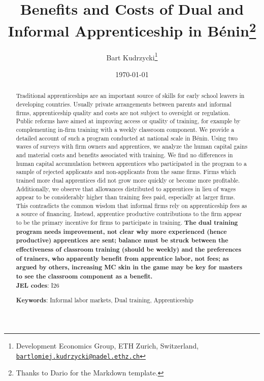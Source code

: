 \documentclass[
  11pt,
a4paper
]{article}
\title{Benefits and Costs of Dual and Informal Apprenticeship in Bénin\thanks{Thanks to Dario for the Markdown template.}}
\author{
  Bart Kudrzycki\thanks{
    Development Economics Group, ETH Zurich, Switzerland, \href{mailto:bartlomiej.kudrzycki@nadel.ethz.ch}{\nolinkurl{bartlomiej.kudrzycki@nadel.ethz.ch}}
  }
}
\date{\today}
\begin{document}
\maketitle
\thispagestyle{empty} %
\begin{abstract}
  \noindent Traditional apprenticeships are an important source of skills for early school leavers in developing countries. Usually private arrangements between parents and informal firms, apprenticeship quality and costs are not subject to oversight or regulation. Public reforms have aimed at improving access or quality of training, for example by complementing in-firm training with a weekly classroom component. We provide a detailed account of such a program conducted at national scale in Bénin. Using two waves of surveys with firm owners and apprentices, we analyze the human capital gains and material costs and benefits associated with training. We find no differences in human capital accumulation between apprentices who participated in the program to a sample of rejected applicants and non-applicants from the same firms. Firms which trained more dual apprentices did not grow more quickly or become more profitable. Additionally, we observe that allowances distributed to apprentices in lieu of wages appear to be considerably higher than training fees paid, especially at larger firms. This contradicts the common wisdom that informal firms rely on apprenticeship fees as a source of financing. Instead, apprentice productive contributions to the firm appear to be the primary incentive for firms to participate in training. \textbf{The dual training program needs improvement, not clear why more experienced (hence productive) apprentices are sent; balance must be struck between the effectiveness of classroom training (should be weekly) and the preferences of trainers, who apparently benefit from apprentice labor, not fees; as argued by others, increasing MC skin in the game may be key for masters to see the classroom component as a benefit.}\\
  
  \noindent \textbf{JEL codes}: I26
    
  \noindent \textbf{Keywords}: Informal labor markets, Dual training, Apprenticeship
  \end{abstract}
\restoregeometry
\end{document}
